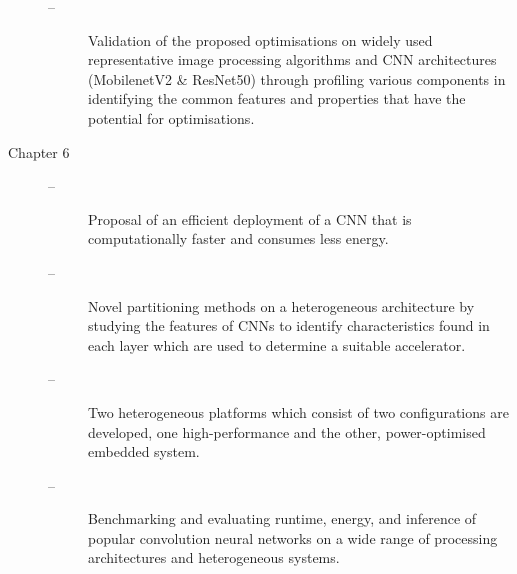 \begin{description}
\begin{description}
    \item[--] Validation of the proposed optimisations on widely used representative image processing algorithms and CNN architectures (MobilenetV2 \& ResNet50) through profiling various components in identifying the common features and properties that have the potential for optimisations.
    \end{description}

    \item[Chapter 6]\hfill
    \begin{description}
  \item[--] Proposal of an efficient deployment of a CNN that is computationally faster and consumes less energy. 
  \item[--] Novel partitioning methods on a heterogeneous architecture by studying the features of CNNs to identify characteristics found in each layer which are used to determine a suitable accelerator.
  \item[--] Two heterogeneous platforms which consist of two configurations are developed, one high-performance and the other, power-optimised embedded system.
  \item[--] Benchmarking and evaluating runtime, energy, and inference of popular convolution neural networks on a wide range of processing architectures and heterogeneous systems. 
    \end{description}


\end{description}



